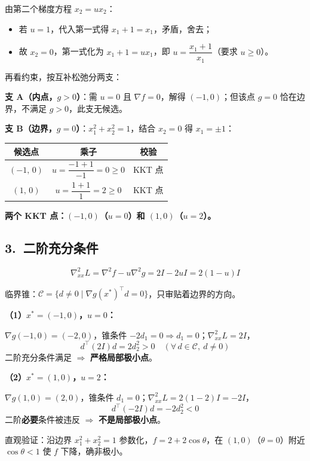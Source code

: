 \documentclass[11pt]{ctexart}
\begin{document}
由第二个梯度方程 $x_2=u x_2$：

\begin{itemize}
\item 若 $u=1$，代入第一式得 $x_1+1=x_1$，矛盾，舍去；
\item 故 $x_2=0$，第一式化为 $x_1+1=u x_1$，即 $u=\dfrac{x_1+1}{x_1}$（要求 $u\ge 0$）。
\end{itemize}

再看约束，按互补松弛分两支：

\textbf{支 A（内点，$g>0$）}：需 $u=0$ 且 $\nabla f=0$，解得 $(-1,0)$；但该点 $g=0$ 恰在边界，不满足 $g>0$，此支无候选。

\textbf{支 B（边界，$g=0$）}：$x_1^2+x_2^2=1$，结合 $x_2=0$ 得 $x_1=\pm1$：

\begin{center}
\begin{tabular}{c|c|c}
\hline
候选点 & 乘子 & 校验 \\
\hline
$(-1,\,0)$ & $u=\dfrac{-1+1}{-1}=0\ge 0$ & KKT 点 \\
$(1,\,0)$ & $u=\dfrac{1+1}{1}=2\ge 0$ & KKT 点 \\
\hline
\end{tabular}
\end{center}

\textbf{两个 KKT 点：$(-1,0)$（$u=0$）和 $(1,0)$（$u=2$）。}

\subsection*{3.\ 二阶充分条件}

\[
\nabla^2_{xx}L=\nabla^2 f-u\nabla^2 g=2I-2uI=2(1-u)I
\]

临界锥：$\mathcal C=\{d\ne 0\mid \nabla g(x^*)^\top d=0\}$，只审贴着边界的方向。

\textbf{（1）$x^*=(-1,0)$，$u=0$：}

$\nabla g(-1,0)=(-2,0)$，锥条件 $-2d_1=0\Rightarrow d_1=0$；$\nabla^2_{xx}L=2I$，
\[
d^\top(2I)d=2d_2^2>0\quad(\forall\, d\in\mathcal C,\ d\ne 0)
\]
二阶充分条件满足 $\Rightarrow$ \textbf{严格局部极小点}。

\textbf{（2）$x^*=(1,0)$，$u=2$：}

$\nabla g(1,0)=(2,0)$，锥条件 $d_1=0$；$\nabla^2_{xx}L=2(1-2)I=-2I$，
\[
d^\top(-2I)d=-2d_2^2<0
\]
二阶\textbf{必要}条件被违反 $\Rightarrow$ \textbf{不是局部极小点}。

直观验证：沿边界 $x_1^2+x_2^2=1$ 参数化，$f=2+2\cos\theta$，在 $(1,0)$（$\theta=0$）附近 $\cos\theta<1$ 使 $f$ 下降，确非极小。
\end{document}
